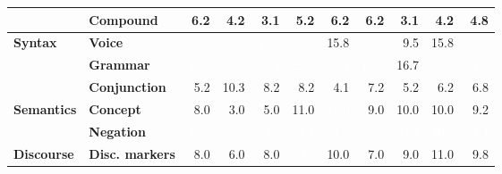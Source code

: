 \begin{table}[h]
{\begin{tabular}{llrrrrrrrrr}
  & \textbf{Compound} & \cellcolor{blue!16} 6.2 & \cellcolor{blue!11} 4.2 & \cellcolor{blue!8} 3.1 & \cellcolor{blue!13} 5.2 & \cellcolor{blue!16} 6.2 & \cellcolor{blue!16} 6.2 & \cellcolor{blue!8} 3.1 & \cellcolor{blue!11} 4.2 & \cellcolor{blue!12} 4.8 \\
\midrule
\textbf{Syntax} & \textbf{Voice} & \cellcolor{blue!80} \textcolor{white}{35.8} & \cellcolor{blue!80} \textcolor{white}{34.7} & \cellcolor{blue!80} \textcolor{white}{41.1} & \cellcolor{blue!68} \textcolor{white}{26.3} & \cellcolor{blue!41} 15.8 & \cellcolor{blue!79} \textcolor{white}{30.5} & \cellcolor{blue!24} 9.5 & \cellcolor{blue!41} 15.8 & \cellcolor{blue!68} \textcolor{white}{26.2} \\
  & \textbf{Grammar} & \cellcolor{blue!79} \textcolor{white}{30.6} & \cellcolor{blue!72} \textcolor{white}{27.8} & \cellcolor{blue!50} \textcolor{white}{19.4} & \cellcolor{blue!57} \textcolor{white}{22.2} & \cellcolor{blue!47} \textcolor{white}{18.1} & \cellcolor{blue!50} \textcolor{white}{19.4} & \cellcolor{blue!43} 16.7 & \cellcolor{blue!54} \textcolor{white}{20.8} & \cellcolor{blue!56} \textcolor{white}{21.9} \\
  & \textbf{Conjunction} & \cellcolor{blue!13} 5.2 & \cellcolor{blue!27} 10.3 & \cellcolor{blue!21} 8.2 & \cellcolor{blue!21} 8.2 & \cellcolor{blue!11} 4.1 & \cellcolor{blue!19} 7.2 & \cellcolor{blue!13} 5.2 & \cellcolor{blue!16} 6.2 & \cellcolor{blue!18} 6.8 \\
\midrule
\textbf{Semantics} & \textbf{Concept} & \cellcolor{blue!21} 8.0 & \cellcolor{blue!8} 3.0 & \cellcolor{blue!13} 5.0 & \cellcolor{blue!28} 11.0 & \cellcolor{blue!46} \textcolor{white}{18.0} & \cellcolor{blue!23} 9.0 & \cellcolor{blue!26} 10.0 & \cellcolor{blue!26} 10.0 & \cellcolor{blue!24} 9.2 \\
  & \textbf{Negation} & \cellcolor{blue!66} \textcolor{white}{25.5} & \cellcolor{blue!61} \textcolor{white}{23.5} & \cellcolor{blue!63} \textcolor{white}{24.5} & \cellcolor{blue!55} \textcolor{white}{21.4} & \cellcolor{blue!63} \textcolor{white}{24.5} & \cellcolor{blue!58} \textcolor{white}{22.4} & \cellcolor{blue!58} \textcolor{white}{22.4} & \cellcolor{blue!79} \textcolor{white}{30.6} & \cellcolor{blue!63} \textcolor{white}{24.4} \\
\midrule
\textbf{Discourse} & \textbf{Disc. markers} & \cellcolor{blue!21} 8.0 & \cellcolor{blue!15} 6.0 & \cellcolor{blue!21} 8.0 & \cellcolor{blue!49} \textcolor{white}{19.0} & \cellcolor{blue!26} 10.0 & \cellcolor{blue!18} 7.0 & \cellcolor{blue!23} 9.0 & \cellcolor{blue!28} 11.0 & \cellcolor{blue!25} 9.8 \\

\end{tabular}}
\end{table}
